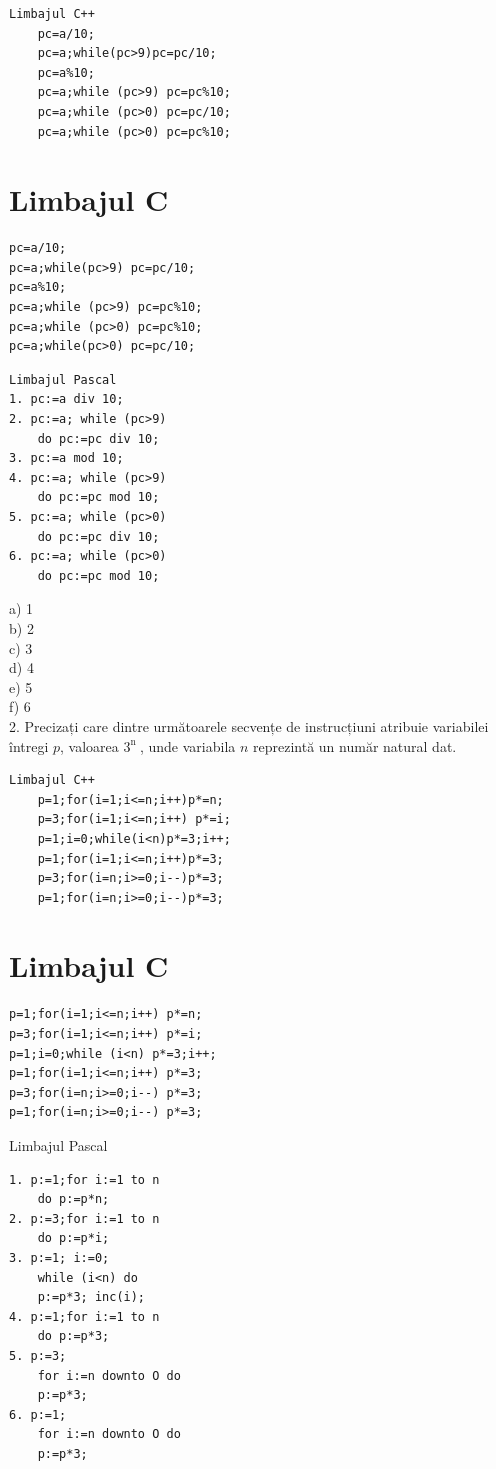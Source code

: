 \documentclass[10pt]{article}
\begin{document}
\begin{verbatim}
Limbajul C++
    pc=a/10;
    pc=a;while(pc>9)pc=pc/10;
    pc=a%10;
    pc=a;while (pc>9) pc=pc%10;
    pc=a;while (pc>0) pc=pc/10;
    pc=a;while (pc>0) pc=pc%10;
\end{verbatim}

\section*{Limbajul C}
\begin{verbatim}
pc=a/10;
pc=a;while(pc>9) pc=pc/10;
pc=a%10;
pc=a;while (pc>9) pc=pc%10;
pc=a;while (pc>0) pc=pc%10;
pc=a;while(pc>0) pc=pc/10;
\end{verbatim}

\begin{verbatim}
Limbajul Pascal
1. pc:=a div 10;
2. pc:=a; while (pc>9)
    do pc:=pc div 10;
3. pc:=a mod 10;
4. pc:=a; while (pc>9)
    do pc:=pc mod 10;
5. pc:=a; while (pc>0)
    do pc:=pc div 10;
6. pc:=a; while (pc>0)
    do pc:=pc mod 10;
\end{verbatim}

a) 1\\
b) 2\\
c) 3\\
d) 4\\
e) 5\\
f) 6\\
2. Precizați care dintre următoarele secvențe de instrucțiuni atribuie variabilei întregi $p$, valoarea $3^{\text {n }}$, unde variabila $n$ reprezintă un număr natural dat.

\begin{verbatim}
Limbajul C++
    p=1;for(i=1;i<=n;i++)p*=n;
    p=3;for(i=1;i<=n;i++) p*=i;
    p=1;i=0;while(i<n)p*=3;i++;
    p=1;for(i=1;i<=n;i++)p*=3;
    p=3;for(i=n;i>=0;i--)p*=3;
    p=1;for(i=n;i>=0;i--)p*=3;
\end{verbatim}

\section*{Limbajul C}
\begin{verbatim}
p=1;for(i=1;i<=n;i++) p*=n;
p=3;for(i=1;i<=n;i++) p*=i;
p=1;i=0;while (i<n) p*=3;i++;
p=1;for(i=1;i<=n;i++) p*=3;
p=3;for(i=n;i>=0;i--) p*=3;
p=1;for(i=n;i>=0;i--) p*=3;
\end{verbatim}

Limbajul Pascal

\begin{verbatim}
1. p:=1;for i:=1 to n
    do p:=p*n;
2. p:=3;for i:=1 to n
    do p:=p*i;
3. p:=1; i:=0;
    while (i<n) do
    p:=p*3; inc(i);
4. p:=1;for i:=1 to n
    do p:=p*3;
5. p:=3;
    for i:=n downto O do
    p:=p*3;
6. p:=1;
    for i:=n downto O do
    p:=p*3;
\end{verbatim}
\end{document}
